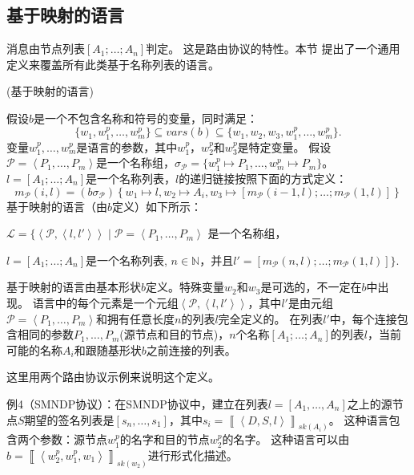 \subsection{基于映射的语言}
消息由节点列表$\left[A_{1};\ldots;A_{n}\right]$判定。
这是路由协议的特性。本节
提出了一个通用定义来覆盖所有此类基于名称列表的语言。

\begin{definition}{(基于映射的语言)}

假设$b$是一个不包含名称和符号的变量，同时满足：
\[
\{w_{1},w_{1}^{p},\ldots,w_{m}^{p}\}\subseteq vars(b)\subseteq\{w_{1},w_{2},w_{3},w_{1}^{p},\ldots,w_{m}^{p}\}.
\]
变量$w_{1}^{p},\ldots,w_{m}^{p}$是语言的参数，其中$w_{1}^{p}$，$w_{2}^{p}$和$w_{3}^{p}$是特定变量。
假设$\mathcal{P}=\left\langle P_{1},\ldots,P_{m}\right\rangle $是一个名称组，$\sigma_{\mathcal{P}}=\{w_{1}^{p}\mapsto P_{1},\ldots,w_{m}^{p}\mapsto P_{m}\}$。
$l=\left[A_{1};\ldots;A_{n}\right]$是一个名称列表，$l$的递归链接按照下面的方式定义：
\[
m_{\mathcal{P}}\left(i,l\right)=\left(b\sigma_{\mathcal{P}}\right)\left\{ w_{1}\mapsto l,w_{2}\mapsto A_{i},w_{3}\mapsto\left[m_{\mathcal{P}}\left(i-1,l\right);\ldots;m_{\mathcal{P}}\left(1,l\right)\right]\right\} 
\]
基于映射的语言（由$b$定义）如下所示：

$\mathcal{L}=\{ \left\langle \mathcal{P},\left\langle l,l'\right\rangle \right\rangle \mid \mathcal{P}=\left\langle P_{1},\ldots,P_{m}\right\rangle$ 是一个名称组，

$l=\left[A_{1};\ldots;A_{n}\right]$是一个名称列表,
$n\in\mathbb{N}$，并且$l'=\left[m_{\mathcal{P}}(n,l);\ldots;m_{\mathcal{P}}(1,l)\right]\}.$
\end{definition}
基于映射的语言由基本形状$b$定义。特殊变量$w_2$和$w_3$是可选的，不一定在$b$中出现。
语言中的每个元素是一个元组$\left\langle \mathcal{P},\left\langle l,l'\right\rangle \right\rangle$，其中$l'$是由元组$\mathcal{P}=\left\langle P_{1},\ldots,P_{m}\right\rangle$和拥有任意长度$n$的列表$l$完全定义的。
在列表$l'$中，每个连接包含相同的参数$P_{1},\ldots,P_{m}$(源节点和目的节点)，$n$个名称$\left[A_{1};\ldots;A_{n}\right]$的列表$l$，当前可能的名称$A_i$和跟随基形状$b$之前连接的列表。

这里用两个路由协议示例来说明这个定义。

例4（SMNDP协议）：在SMNDP协议中，建立在列表$l=\left[A_{1},\ldots,A_{n}\right]$之上的源节点$S$期望的签名列表是$\left[s_{n},\ldots,s_{1}\right]$，其中$s_{i}=\left\llbracket \left\langle D,S,l\right\rangle \right\rrbracket _{sk(A_{i})}$。
这种语言包含两个参数：源节点$w_1^p$的名字和目的节点$w_2^p$的名字。
这种语言可以由$b=\left\llbracket \left\langle w_2^p,w_1^p,w_1\right\rangle \right\rrbracket _{sk(w_{2})}$进行形式化描述。

